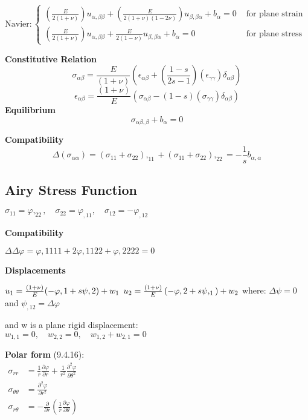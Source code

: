 \[
\text{Navier}:\left\{\begin{array}{cl}{\left(\frac{E}{2(1+\nu)}\right) u_{\alpha, \beta \beta}+\left(\frac{E}{2(1+\nu)(1-2 \nu)}\right) u_{\beta, \beta \alpha}+b_{\alpha}=0} & {\text { for plane strain }} \\ {\left(\frac{E}{2(1+\nu)}\right) u_{\alpha, \beta \beta}+\frac{E}{2(1-\nu)} u_{\beta, \beta \alpha}+b_{\alpha}=0} & {\text { for plane stress }}\end{array}\right.
\]

\textbf{Constitutive Relation} \[
\sigma_{\alpha \beta}=\frac{E}{(1+\nu)}\left(\epsilon_{\alpha \beta}+\left(\frac{1-s}{2 s-1}\right)\left(\epsilon_{\gamma \gamma}\right) \delta_{\alpha \beta}\right)
\] \[
\epsilon_{\alpha \beta}=\frac{(1+\nu)}{E}\left(\sigma_{\alpha \beta}-(1-s)\left(\sigma_{\gamma \gamma}\right) \delta_{\alpha \beta}\right)
\] \textbf{Equilibrium} \[
\sigma_{\alpha \beta, \beta}+b_{\alpha}=0
\]

\textbf{Compatibility} \[
\Delta\left(\sigma_{\alpha \alpha}\right)=\left(\sigma_{11}+\sigma_{22}\right),_{11}+\left(\sigma_{11}+\sigma_{22}\right),_{22}=-\frac{1}{s} b_{\alpha, \alpha}
\]

\hypertarget{airy-stress-function}{%
\subsection{Airy Stress Function}\label{airy-stress-function}}

\(\sigma_{11}=\varphi,_{22}, \quad \sigma_{22}=\varphi_{, 11}, \quad \sigma_{12}=-\varphi_{, 12}\)

\textbf{Compatibility}

\(\Delta \Delta \varphi=\varphi, 1111+2 \varphi, 1122+\varphi, 2222=0\)

\textbf{Displacements}

\(u_{1}=\frac{(1+\nu)}{E}(-\varphi, 1+s \psi, 2)+w_{1}\\\)
\(u_{2}=\frac{(1+\nu)}{E}\left(-\varphi, 2+s \psi,_{1}\right)+w_{2}\\\)
where: \(\Delta \psi =0\) and \(\psi_{, 12} =\Delta \varphi\)

and w is a plane rigid displacement:\\
\(w_{1,1}=0, \quad w_{2,2}=0, \quad w_{1,2}+w_{2,1}=0\)

\textbf{Polar form} (9.4.16):\\
\(\begin{aligned} \sigma_{r r} &=\frac{1}{r} \frac{\partial \varphi}{\partial r}+\frac{1}{r^{2}} \frac{\partial^{2} \varphi}{\partial \theta^{2}} \\ \sigma_{\theta \theta} &=\frac{\partial^{2} \varphi}{\partial r^{2}} \\ \sigma_{r \theta} &=-\frac{\partial}{\partial r}\left(\frac{1}{r} \frac{\partial \varphi}{\partial \theta}\right) \end{aligned}\)

